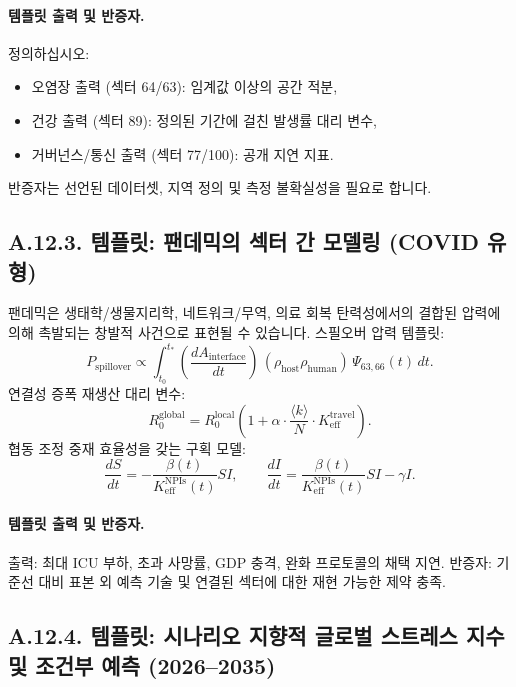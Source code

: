 \documentclass[13pt,a4paper]{article}
\begin{document}
\paragraph{템플릿 출력 및 반증자.}
정의하십시오:
\begin{itemize}[leftmargin=*]
	\item 오염장 출력 (섹터 64/63): 임계값 이상의 공간 적분,
	\item 건강 출력 (섹터 89): 정의된 기간에 걸친 발생률 대리 변수,
	\item 거버넌스/통신 출력 (섹터 77/100): 공개 지연 지표.
\end{itemize}
반증자는 선언된 데이터셋, 지역 정의 및 측정 불확실성을 필요로 합니다.

\subsection*{A.12.3. 템플릿: 팬데믹의 섹터 간 모델링 (COVID 유형)}

팬데믹은 생태학/생물지리학, 네트워크/무역, 의료 회복 탄력성에서의 결합된 압력에 의해 촉발되는 창발적 사건으로 표현될 수 있습니다. 스필오버 압력 템플릿:
$$
P_{\mathrm{spillover}} \propto \int_{t_0}^{t_{*}}
\left(\frac{dA_{\mathrm{interface}}}{dt}\right)\,
\left(\rho_{\mathrm{host}}\rho_{\mathrm{human}}\right)\,
\Psi_{63,66}(t)\,dt.
$$
연결성 증폭 재생산 대리 변수:
$$
R_0^{\mathrm{global}} = R_0^{\mathrm{local}}\left(1+\alpha\cdot \frac{\langle k\rangle}{N}\cdot K_{\mathrm{eff}}^{\mathrm{travel}}\right).
$$
협동 조정 중재 효율성을 갖는 구획 모델:
$$
\frac{dS}{dt} = - \frac{\beta(t)}{K_{\mathrm{eff}}^{\mathrm{NPIs}}(t)}SI,\qquad
\frac{dI}{dt} = \frac{\beta(t)}{K_{\mathrm{eff}}^{\mathrm{NPIs}}(t)}SI - \gamma I.
$$

\paragraph{템플릿 출력 및 반증자.}
출력: 최대 ICU 부하, 초과 사망률, GDP 충격, 완화 프로토콜의 채택 지연.
반증자: 기준선 대비 표본 외 예측 기술 및 연결된 섹터에 대한 재현 가능한 제약 충족.

\subsection*{A.12.4. 템플릿: 시나리오 지향적 글로벌 스트레스 지수 및 조건부 예측 (2026--2035)}
\end{document}

